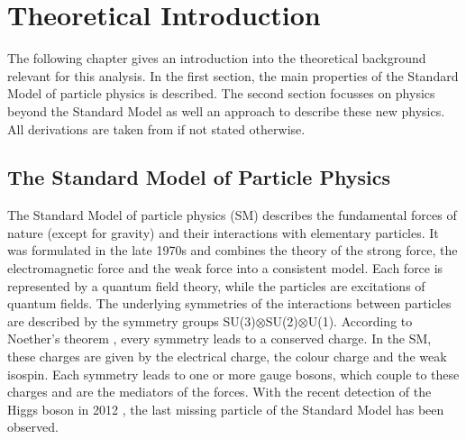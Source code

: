 \chapter{Theoretical Introduction}
\label{chap::TheoreticalIntroduction}
The following chapter gives an introduction into the theoretical background relevant for this analysis. In the first section, the main properties of the Standard Model of particle physics is described. The second section focusses on physics beyond the Standard Model as well an approach to describe these new physics. All derivations are taken from \cite{peskin,povh,mandl} if not stated otherwise.

\section{The Standard Model of Particle Physics}
The Standard Model of particle physics (SM) describes the fundamental forces of nature (except for gravity) and their interactions with elementary particles. It was formulated in the late 1970s and combines the theory of the strong force, the electromagnetic force and the weak force into a consistent model. Each force is represented by a quantum field theory, while the particles are excitations of quantum fields. The underlying symmetries of the interactions between particles are described by the symmetry groups SU(3)$\otimes$SU(2)$\otimes$U(1). According to Noether's theorem \cite{noether}, every symmetry leads to a conserved charge. In the SM, these charges are given by the electrical charge, the colour charge and the weak isospin. Each symmetry leads to one or more gauge bosons, which couple to these charges and are the mediators of the forces. With the recent detection of the Higgs boson in 2012 \cite{cms_higgsdiscov,atlas_higgsdiscov}, the last missing particle of the Standard Model has been observed.\\

